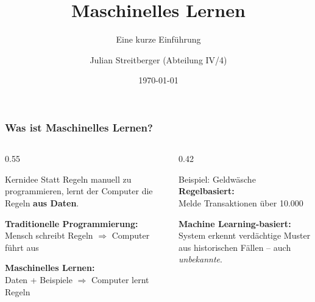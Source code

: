 \documentclass[11pt, aspectratio=169]{beamer}
\title{Maschinelles Lernen}
\subtitle{Eine kurze Einführung}
\author{Julian Streitberger (Abteilung IV/4)}
\date{\today}
\begin{document}
\maketitle


\begin{frame}
    \frametitle{Was ist Maschinelles Lernen?}
    \begin{columns}[t]
        \begin{column}{0.55\textwidth}
            \begin{block}{Kernidee}
                Statt Regeln manuell zu programmieren, lernt der Computer die Regeln \textbf{aus Daten}.
            \end{block}
            \vspace{0.4cm}
            \textbf{Traditionelle Programmierung:}\\
            Mensch schreibt Regeln $\Rightarrow$ Computer führt aus
            \vspace{0.3cm}
            
            \textbf{Maschinelles Lernen:}\\
            Daten + Beispiele $\Rightarrow$ Computer lernt Regeln
        \end{column}
        \begin{column}{0.42\textwidth}
            \begin{exampleblock}{Beispiel: Geldwäsche}
                \textbf{Regelbasiert:}\\
                \glqq Melde Transaktionen über 10.000 \texteuro\grqq
                \vspace{0.2cm}
                
                \textbf{Machine Learning-basiert:}\\
                System erkennt verdächtige Muster aus historischen Fällen -- auch \textit{unbekannte}.
            \end{exampleblock}
        \end{column}
    \end{columns}
\end{frame}

\end{document}
